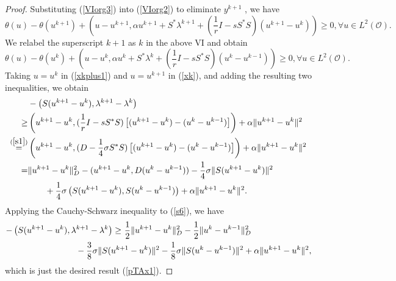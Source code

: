 \documentclass[final]{siamart171218}
\theoremstyle{remark}
\begin{document}
\begin{proof}
	Substituting (\ref{VIorg3}) into (\ref{VIorg2}) to eliminate $y^{k+1}$ , we have
	{
	\begin{equation}
	\label{xkplus1}
	\theta(u)-\theta(u^{k+1})+\left (u - u^{k+1}, \alpha u^{k+1} + S^* \lambda^{k+1} + (\frac{1}{r}I  - s S^*S )(u^{k+1} - u^k) \right) \geq 0, \forall u\in L^2(\mathcal{O}).
	\end{equation}
}
    We relabel the superscript $k+1$ as $k$ in the above VI and obtain
	\begin{equation}
	\label{xk}
	\theta(u)-\theta(u^{k})+\left (u - u^{k}, \alpha u^{k} + S^* \lambda^k + (\frac{1}{r}I  - s S^*S )(u^{k} - u^{k-1}) \right) \geq 0, \forall u\in L^2(\mathcal{O}).
	\end{equation}
	Taking $u = u^k$ in (\ref{xkplus1}) and $u = u^{k+1}$ in (\ref{xk}), and adding the resulting two inequalities, we obtain
	\begin{equation}\label{s6}
	\begin{aligned}
	&-  \left( S(u^{k+1}- u^{k}),\lambda^{k+1}  - \lambda^k\right) \\
	 \geq & \left(u^{k+1} - u^{k},  (\frac{1}{r}I  - s S^* S )\left[(u^{k+1} - u^{k}) - (u^k - u^{k-1})\right] \right) +  \alpha \|u^{k+1} - u^k \|^2 \\
	 \overset{(\ref{s1})}{=}&  \left(u^{k+1} - u^{k},  (D -\frac{1}{4}\sigma S^* S )\left[(u^{k+1} - u^{k}) - (u^k - u^{k-1})\right] \right) +  \alpha \|u^{k+1} - u^k \|^2 \\
	 =&  \|u^{k+1} - u^{k}\|^2_D -  (u^{k+1} - u^{k}, D (u^k - u^{k-1})) - \frac{1}{4}  \sigma  \|S(u^{k+1} - u^{k})\|^2\\
	& \qquad + \frac{1}{4}  \sigma \left(S(u^{k+1} - u^{k}),  S (u^k - u^{k-1})\right) +  \alpha \|u^{k+1} - u^k \|^2 .
	\end{aligned}
	\end{equation}
	Applying the Cauchy-Schwarz inequality to (\ref{s6}), we have
	\begin{equation*}
	\begin{aligned}
	-  \left( S (u^{k+1}- u^{k}),\lambda^{k+1}  - \lambda^k \right)
	\geq ~ & \frac{1}{2} \|u^{k+1} - u^{k}\|^2_D - \frac{1}{2} \|u^{k} - u^{k-1}\|^2_D \\
	&\hspace{-2cm} - \frac{3}{8} \sigma  \|S(u^{k+1} - u^{k})\|^2 - \frac{1}{8}  \sigma \|S(u^{k} - u^{k-1})\|^2  +  \alpha \|u^{k+1} - u^k \|^2,
	\end{aligned}
	\end{equation*}
	which is just the desired result (\ref{pTAx1}).
\end{proof}
\end{document}
